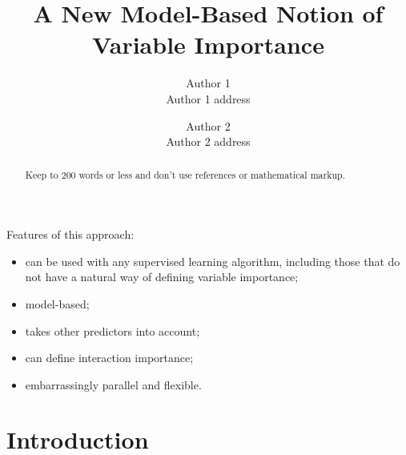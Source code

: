\documentclass{article}
\title{A New Model-Based Notion of Variable Importance}
\date{}
\author{Author 1\\ Author 1 address \and Author 2\\Author 2 address}
\begin{document}
\maketitle


\begin{abstract}
Keep to 200 words or less and don't use references or mathematical markup.
\end{abstract}


Features of this approach:
\begin{itemize}
  \item can be used with any supervised learning algorithm, including those that do not have a natural way of defining variable importance;
  \item model-based;
  \item takes other predictors into account;
  \item can define interaction importance;
  \item embarrassingly parallel and flexible.
\end{itemize}


\section{Introduction}
\end{document}
